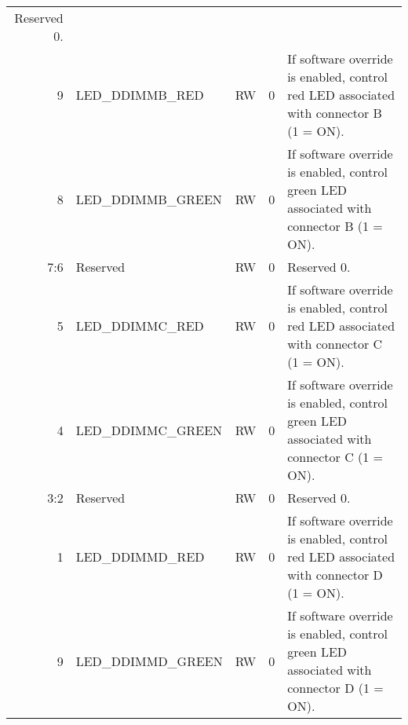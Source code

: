 \begin{tabularx}{\textwidth}{r|l|l|l|X}
  Reserved 0. \\

  9     & LED\_DDIMMB\_RED        & RW   & 0     &

  If software override is enabled, control red LED associated with connector B (1 = ON). \\

  8     & LED\_DDIMMB\_GREEN      & RW   & 0     &

  If software override is enabled, control green LED associated with connector B (1 = ON). \\

  7:6   & Reserved                & RW   & 0     &

  Reserved 0. \\

  5     & LED\_DDIMMC\_RED        & RW   & 0     &

  If software override is enabled, control red LED associated with connector C (1 = ON). \\

  4     & LED\_DDIMMC\_GREEN      & RW   & 0     &

  If software override is enabled, control green LED associated with connector C (1 = ON). \\

  3:2   & Reserved                & RW   & 0     &

  Reserved 0. \\

  1     & LED\_DDIMMD\_RED        & RW   & 0     &

  If software override is enabled, control red LED associated with connector D (1 = ON). \\

  9     & LED\_DDIMMD\_GREEN      & RW   & 0     &

  If software override is enabled, control green LED associated with connector D (1 = ON). \\
\end{tabularx}

